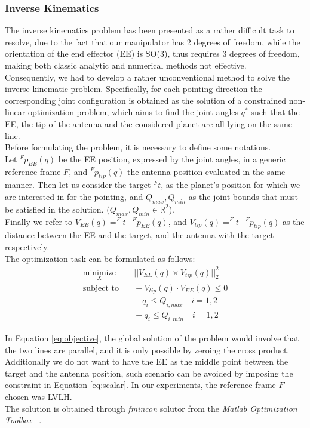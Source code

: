\documentclass[main.tex]{subfiles}
\begin{document}
\subsubsection{Inverse Kinematics}
The inverse kinematics problem has been presented as a rather difficult task to resolve, due to the fact that our manipulator has 2 degrees of freedom, while the orientation of the end effector (EE) is SO(3), thus requires 3 degrees of freedom, making both classic analytic and numerical methods not effective.\\
Consequently, we had to develop a rather unconventional method to solve the inverse kinematic problem. Specifically, for each pointing direction the corresponding joint configuration is obtained as the solution of a constrained non-linear optimization problem, which aims to find the joint angles $q^*$ such that the EE, the tip of the antenna and the considered planet are all lying on the same line.\\
Before formulating the problem, it is necessary to define some notations.\\
Let $^Fp_{EE}(q)$ be the EE position, expressed by the joint angles, in a generic reference frame $F$, and $^Fp_{tip}(q)$ the antenna position evaluated in the same manner. Then let us consider the target $^Ft$, as the planet's position for which we are interested in for the pointing, and $Q_{max}, Q_{min}$ as the joint bounds that must be satisfied in the solution. ($Q_{max}, Q_{min} \in \mathbb{R}^2$).\\ Finally we refer to $V_{EE}(q) = ^Ft - ^Fp_{EE}(q)$, and $V_{tip}(q) =  ^Ft - ^Fp_{tip}(q) $ as the distance between the EE and the target, and the antenna with the target respectively.\\
The optimization task can be formulated as follows:
\begin{subequations}
\label{eq:optim}
\begin{align}
    \underset{X}{\text{minimize}}
        & \quad ||V_{EE}(q) \times V_{tip}(q)||_2^2 \label{eq:objective}\\
    \text{subject to} 
        & \quad -V_{tip}(q)\cdot V_{EE}(q) \leq 0 \label{eq:scalar}\\
        & \quad \quad q_i \leq Q_{i,max} \quad i = 1, 2 \nonumber\\
        & \quad -q_i \leq Q_{i,min} \quad i = 1, 2 \nonumber
\end{align}
\end{subequations}

In Equation \ref{eq:objective}, the global solution of the problem would involve that the two lines are parallel, and it is only possible by zeroing the cross product. Additionally we do not want to have the EE as the middle point between the target and the antenna position, such scenario can be avoided by imposing the constraint in Equation \ref{eq:scalar}.
In our experiments, the reference frame $F$ chosen was LVLH.\\
The solution is obtained through \textit{fmincon}{} solutor from the \textit{Matlab Optimization Toolbox} ~.
\end{document}
